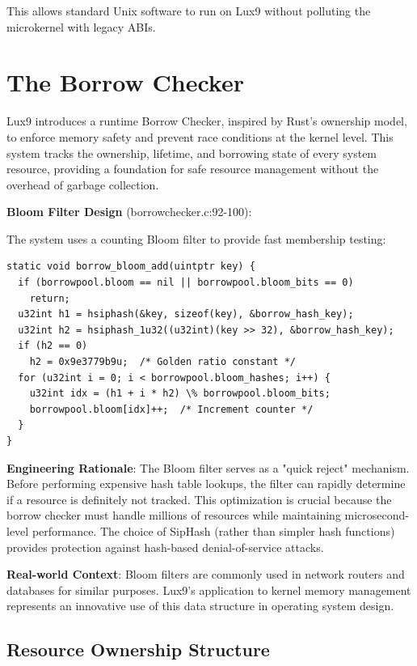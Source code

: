 \documentclass[11pt,letterpaper]{article}
\begin{document}
This allows standard Unix software to run on Lux9 without polluting the microkernel with legacy ABIs.

\section{The Borrow Checker}

Lux9 introduces a runtime Borrow Checker, inspired by Rust's ownership model, to enforce memory safety and prevent race conditions at the kernel level. This system tracks the ownership, lifetime, and borrowing state of every system resource, providing a foundation for safe resource management without the overhead of garbage collection.

\textbf{Bloom Filter Design} (borrowchecker.c:92-100):

The system uses a counting Bloom filter to provide fast membership testing:

\begin{lstlisting}
static void borrow_bloom_add(uintptr key) {
  if (borrowpool.bloom == nil || borrowpool.bloom_bits == 0)
    return;
  u32int h1 = hsiphash(&key, sizeof(key), &borrow_hash_key);
  u32int h2 = hsiphash_1u32((u32int)(key >> 32), &borrow_hash_key);
  if (h2 == 0)
    h2 = 0x9e3779b9u;  /* Golden ratio constant */
  for (u32int i = 0; i < borrowpool.bloom_hashes; i++) {
    u32int idx = (h1 + i * h2) \% borrowpool.bloom_bits;
    borrowpool.bloom[idx]++;  /* Increment counter */
  }
}
\end{lstlisting}

\textbf{Engineering Rationale}: The Bloom filter serves as a "quick reject" mechanism. Before performing expensive hash table lookups, the filter can rapidly determine if a resource is definitely not tracked. This optimization is crucial because the borrow checker must handle millions of resources while maintaining microsecond-level performance. The choice of SipHash (rather than simpler hash functions) provides protection against hash-based denial-of-service attacks.

\textbf{Real-world Context}: Bloom filters are commonly used in network routers and databases for similar purposes. Lux9's application to kernel memory management represents an innovative use of this data structure in operating system design.

\subsection{Resource Ownership Structure}
\end{document}
